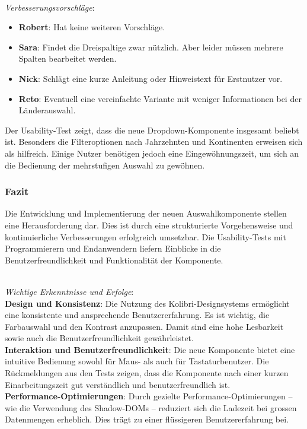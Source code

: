  \\
\emph{Verbesserungsvorschläge}: 

\begin{itemize}
    \item \textbf{Robert}: 
          Hat keine weiteren Vorschläge. 
    \item \textbf{Sara}: 
          Findet die Dreispaltige zwar nützlich. 
          Aber leider müssen mehrere Spalten bearbeitet werden. 
    \item \textbf{Nick}: 
          Schlägt eine kurze Anleitung oder Hinweistext für Erstnutzer vor. 
    \item \textbf{Reto}: 
          Eventuell eine vereinfachte Variante mit weniger Informationen bei der Länderauswahl. 
\end{itemize}

Der Usability-Test zeigt, dass die neue Dropdown-Komponente insgesamt beliebt ist. 
Besonders die Filteroptionen nach Jahrzehnten und Kontinenten erweisen sich als hilfreich. 
Einige Nutzer benötigen jedoch eine Eingewöhnungszeit, um sich an die Bedienung der mehrstufigen Auswahl zu gewöhnen. 


\subsubsection{\color{dblue} Fazit}
\label{sec:userTestsSummery}

Die Entwicklung und Implementierung der neuen Auswahlkomponente stellen eine Herausforderung dar. 
Dies ist durch eine strukturierte Vorgehensweise und kontinuierliche Verbesserungen erfolgreich umsetzbar. 
Die Usability-Tests mit Programmierern und Endanwendern liefern Einblicke in die Benutzerfreundlichkeit und Funktionalität der Komponente. 

 \\
\noindent
\emph{Wichtige Erkenntnisse und Erfolge}: 
\\
\textbf{Design und Konsistenz}: 
Die Nutzung des Kolibri-Designsystems ermöglicht eine konsistente und ansprechende Benutzererfahrung. 
Es ist wichtig, die Farbauswahl und den Kontrast anzupassen. 
Damit sind eine hohe Lesbarkeit sowie auch die Benutzerfreundlichkeit gewährleistet.
\\
\textbf{Interaktion und Benutzerfreundlichkeit}: 
Die neue Komponente bietet eine intuitive Bedienung sowohl für Maus- als auch für Tastaturbenutzer. 
Die Rückmeldungen aus den Tests zeigen, dass die Komponente nach einer kurzen Einarbeitungszeit gut verständlich und benutzerfreundlich ist. 
\\
\textbf{Performance-Optimierungen}: 
Durch gezielte Performance-Optimierungen – wie die Verwendung des Shadow-DOMs – reduziert sich die Ladezeit bei grossen Datenmengen erheblich. 
Dies trägt zu einer flüssigeren Benutzererfahrung bei. 


